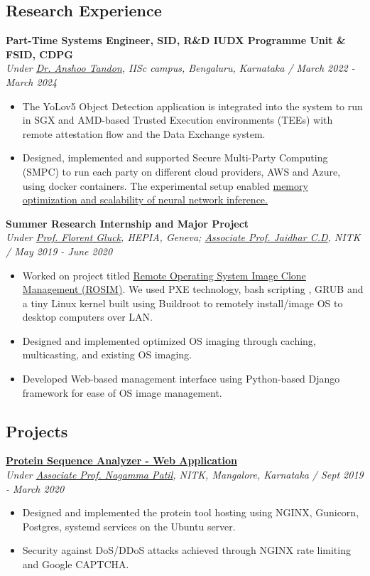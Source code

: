 \documentclass[a4paper,11pt]{article}
\newcommand{\isep}{-2 pt}
\begin{document}
\subsection*{Research Experience}
\textbf{Part-Time Systems Engineer, SID,  R\&D IUDX Programme Unit \& FSID, CDPG} \\
\textit{Under \href{https://anshootandon.github.io/profile/}{Dr. Anshoo Tandon}, IISc campus, Bengaluru, Karnataka / March 2022 - March 2024}

\begin{itemize}
\item The YoLov5 Object Detection application is integrated into the system to run in SGX and AMD-based Trusted Execution environments (TEEs) with remote attestation flow and the Data Exchange system.
\item Designed, implemented and supported Secure Multi-Party Computing (SMPC) to run each party on different cloud providers, AWS and Azure, using docker containers. The experimental setup enabled \href{https://ieeexplore.ieee.org/document/10427509/}{memory optimization and scalability of neural network inference.}
\end{itemize}
\textbf {Summer Research Internship and Major Project} \\
\textit{Under \href{https://www.hesge.ch/hepia/annuaire/florent-gluck}{Prof. Florent Gluck}, HEPIA, Geneva; \href{https://infotech.nitk.ac.in/faculty/jaidhar-c-d}{Associate Prof. Jaidhar C.D}, NITK / May 2019 - June 2020}
\begin{itemize} 
     \item Worked on project titled \href{https://gitlab.com/remote-os-Image-clone-deployment}{Remote Operating System Image Clone Management (ROSIM)}. We used PXE technology, bash scripting ,  GRUB and a tiny Linux kernel built using Buildroot to remotely install/image OS to desktop computers over LAN. 
   \item Designed and implemented optimized OS imaging through caching, multicasting, and existing OS imaging.
	\item Developed Web-based management interface using Python-based Django framework for ease of OS image management.
\end{itemize}
\subsection*{Projects}
\textbf{\href{https://nitkit-vgst727-nppsa.nitk.ac.in/}{Protein Sequence Analyzer - Web Application}}  \\
  \textit{Under  \href{https://infotech.nitk.ac.in/faculty/nagamma-patil}{Associate Prof. Nagamma Patil}, NITK, Mangalore, Karnataka / Sept 2019 - March 2020}  
	\begin{itemize}\itemsep \isep                  
    \item Designed and implemented the protein tool hosting using NGINX, Gunicorn, Postgres, systemd services on the Ubuntu server.
	\item Security against DoS/DDoS attacks achieved through NGINX rate limiting and Google CAPTCHA.
	\end{itemize}
\end{document}
